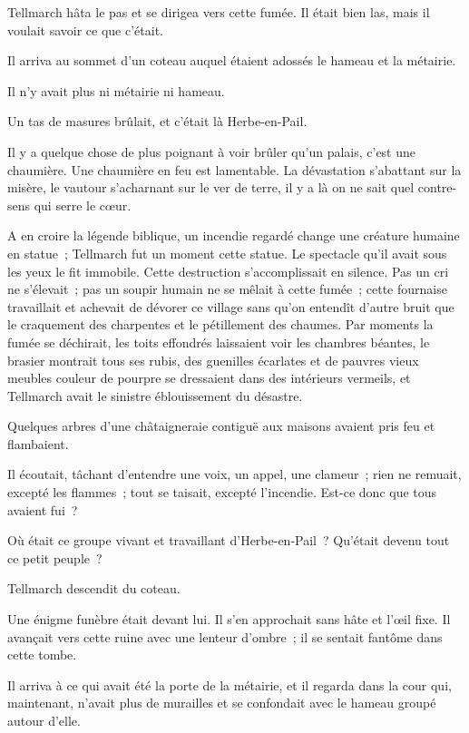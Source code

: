 \documentclass[french,twoside]{book} %
\begin{document}
Tellmarch hâta le pas et se dirigea vers cette fumée. Il était bien las, mais il voulait savoir ce que c’était.\par
Il arriva au sommet d’un coteau auquel étaient adossés le hameau et la métairie.\par
Il n’y avait plus ni métairie ni hameau.\par
Un tas de masures brûlait, et c’était là Herbe-en-Pail.\par
Il y a quelque chose de plus poignant à voir brûler qu’un palais, c’est une chaumière. Une chaumière en feu est lamentable. La dévastation s’abattant sur la misère, le vautour s’acharnant sur le ver de terre, il y a là on ne sait quel contre-sens qui serre le cœur.\par
 A en croire la légende biblique, un incendie regardé change une créature humaine en statue ; Tellmarch fut un moment cette statue. Le spectacle qu’il avait sous les yeux le fit immobile. Cette destruction s’accomplissait en silence. Pas un cri ne s’élevait ; pas un soupir humain ne se mêlait à cette fumée ; cette fournaise travaillait et achevait de dévorer ce village sans qu’on entendît d’autre bruit que le craquement des charpentes et le pétillement des chaumes. Par moments la fumée se déchirait, les toits effondrés laissaient voir les chambres béantes, le brasier montrait tous ses rubis, des guenilles écarlates et de pauvres vieux meubles couleur de pourpre se dressaient dans des intérieurs vermeils, et Tellmarch avait le sinistre éblouissement du désastre.\par
Quelques arbres d’une châtaigneraie contiguë aux maisons avaient pris feu et flambaient.\par
Il écoutait, tâchant d’entendre une voix, un appel, une clameur ; rien ne remuait, excepté les flammes ; tout se taisait, excepté l’incendie. Est-ce donc que tous avaient fui ?\par
Où était ce groupe vivant et travaillant d’Herbe-en-Pail ? Qu’était devenu tout ce petit peuple ?\par
Tellmarch descendit du coteau.\par
Une énigme funèbre était devant lui. Il s’en approchait sans hâte et l’œil fixe. Il avançait vers cette ruine avec une lenteur d’ombre ; il se sentait fantôme dans cette tombe.\par
Il arriva à ce qui avait été la porte de la métairie, et il regarda dans la cour qui, maintenant, n’avait plus  de murailles et se confondait avec le hameau groupé autour d’elle.\par
\end{document}
